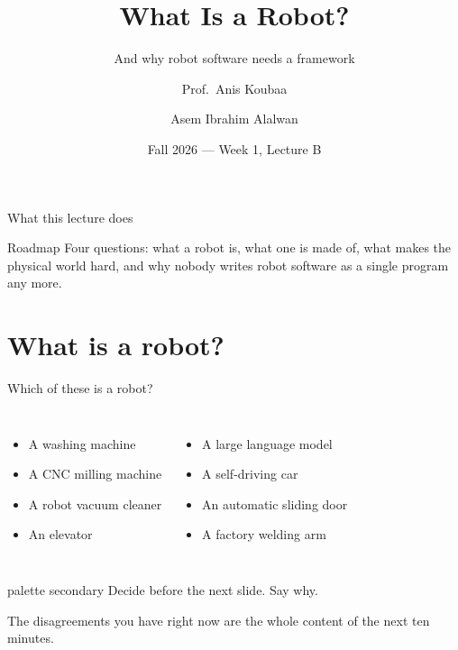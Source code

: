 \documentclass[aspectratio=169]{beamer}
\title[EE 414 --- Week 1B]{What Is a Robot?}
\subtitle{And why robot software needs a framework}
\author[Koubaa \and Alalwan]{Prof.\ Anis Koubaa \and Asem Ibrahim Alalwan}
\institute[Alfaisal University]{
    EE 414 --- Introduction to Robotics\\
    College of Engineering\\
    Alfaisal University
}
\date{Fall 2026 --- Week 1, Lecture B}
\begin{document}
\begin{frame}[plain]
  \titlepage
\end{frame}

\begin{frame}{What this lecture does}
  \begin{block}{Roadmap}
    \small Four questions: what a robot is, what one is made of, what makes the physical
    world hard, and why nobody writes robot software as a single program any more.
  \end{block}
  \vspace{0.2em}
  {\scriptsize\tableofcontents[hideallsubsections]}
\end{frame}

\section{What is a robot?}

\begin{frame}{Which of these is a robot?}
  \begin{columns}[T,onlytextwidth]
    \begin{itemize}\small
      \item A washing machine
      \item A CNC milling machine
      \item A robot vacuum cleaner
      \item An elevator
    \end{itemize}
    \begin{itemize}\small
      \item A large language model
      \item A self-driving car
      \item An automatic sliding door
      \item A factory welding arm
    \end{itemize}
  \end{columns}

  \vspace{1.2em}
  \centering
  \begin{beamercolorbox}[sep=8pt,center,rounded=true]{palette secondary}
    Decide before the next slide. Say why.
  \end{beamercolorbox}

  \vspace{0.5em}
  {\small The disagreements you have right now are the whole content of the next ten minutes.}
\end{frame}
\end{document}
